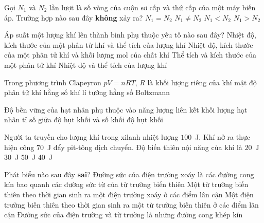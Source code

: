 	\begin{ex}%
		Gọi $N_1$ và $N_2$ lần lượt là số vòng của cuộn sơ cấp và thứ cấp của một máy biến áp. Trường hợp nào sau đây \textbf{không} xảy ra?
		\choice
		{\True $N_1=N_2$}
		{$N_1\neq N_2$}
		{$N_1<N_2$}
		{$N_1>N_2$}
	\end{ex}

	\begin{ex}%
		Áp suất một lượng khí lên thành bình phụ thuộc yếu tố nào sau đây?
		\choice
		{Nhiệt độ, kích thước của một phân tử khí và thể tích của lượng khí}
		{Nhiệt độ, kích thước của một phân tử khí và khối lượng mol của chất khí}
		{Thể tích và kích thước của một phân tử khí}
		{\True Nhiệt độ và thể tích của lượng khí}
	\end{ex}

	\begin{ex}%
		Trong phương trình Clapeyron $pV=nRT$, $R$ là
		\choice
		{khối lượng riêng của khí}
		{mật độ phân tử khí}
		{\True hằng số khí lí tưởng}
		{hằng số Boltzmann}
	\end{ex}

	\begin{ex}%
		Độ bền vững của hạt nhân phụ thuộc vào
		\choice
		{năng lượng liên kết}
		{khối lượng hạt nhân}
		{\True tỉ số giữa độ hụt khối và số khối}
		{độ hụt khối}
	\end{ex}

	\begin{ex}%
		Người ta truyền cho lượng khí trong xilanh nhiệt lượng $100$~J. Khí nở ra thực hiện công $70$~J đẩy pit-tông dịch chuyển. Độ biến thiên nội năng của khí là
		\choice
		{$20$~J}
		{\True $30$~J}
		{$50$~J}
		{$40$~J}
	\end{ex}

	\begin{ex}%
		Phát biểu nào sau đây \textbf{sai}?
		\choice
		{Đường sức của điện trường xoáy là các đường cong kín bao quanh các đường sức từ của từ trường biến thiên}
		{Một từ trường biến thiên theo thời gian sinh ra một điện trường xoáy ở các điểm lân cận}
		{Một điện trường biến thiên theo thời gian sinh ra một từ trường biến thiên ở các điểm lân cận}
		{\True Đường sức của điện trường và từ trường là những đường cong khép kín}
	\end{ex}

